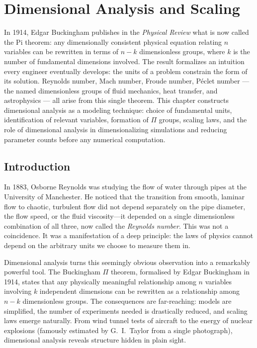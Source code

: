\chapter{Dimensional Analysis and Scaling}
\label{ch:dimensional}

In 1914, Edgar Buckingham publishes in the \emph{Physical Review} what is now called the Pi theorem: any dimensionally consistent physical equation relating $n$ variables can be rewritten in terms of $n-k$ dimensionless groups, where $k$ is the number of fundamental dimensions involved. The result formalizes an intuition every engineer eventually develops: the units of a problem constrain the form of its solution. Reynolds number, Mach number, Froude number, Péclet number --- the named dimensionless groups of fluid mechanics, heat transfer, and astrophysics --- all arise from this single theorem. This chapter constructs dimensional analysis as a modeling technique: choice of fundamental units, identification of relevant variables, formation of $\Pi$ groups, scaling laws, and the role of dimensional analysis in dimensionalizing simulations and reducing parameter counts before any numerical computation.

\section{Introduction}

In 1883, Osborne Reynolds was studying the flow of water through pipes at the University of Manchester. He noticed that the transition from smooth, laminar flow to chaotic, turbulent flow did not depend separately on the pipe diameter, the flow speed, or the fluid viscosity---it depended on a single dimensionless combination of all three, now called the \emph{Reynolds number}. This was not a coincidence. It was a manifestation of a deep principle: the laws of physics cannot depend on the arbitrary units we choose to measure them in.

Dimensional analysis turns this seemingly obvious observation into a remarkably powerful tool. The Buckingham $\Pi$ theorem, formalised by Edgar Buckingham in 1914, states that any physically meaningful relationship among $n$ variables involving $k$ independent dimensions can be rewritten as a relationship among $n - k$ dimensionless groups. The consequences are far-reaching: models are simplified, the number of experiments needed is drastically reduced, and scaling laws emerge naturally. From wind tunnel tests of aircraft to the energy of nuclear explosions (famously estimated by G.~I.~Taylor from a single photograph), dimensional analysis reveals structure hidden in plain sight.

